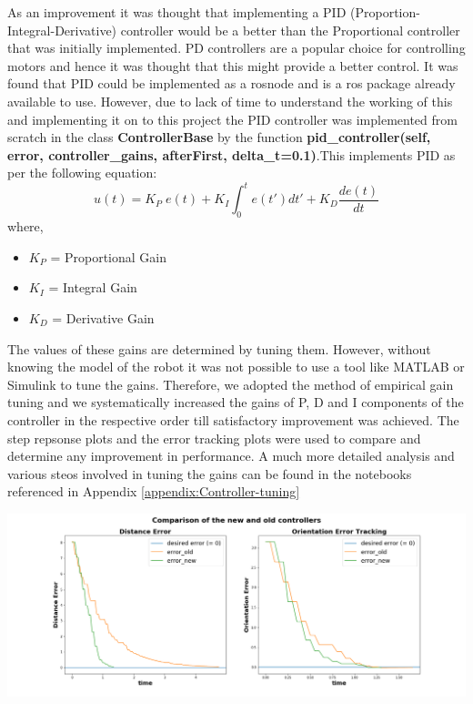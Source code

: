 \documentclass[a4paper,12pt]{article}
\begin{document}
		As an improvement it was thought that implementing a PID (Proportion-Integral-Derivative) controller would be a better than the Proportional controller that was initially implemented. PD controllers are a popular choice for controlling motors and hence it was thought that this might provide a better control. It was found that PID could be implemented as a rosnode and is a ros package already available to use. However, due to lack of time to understand the working of this and implementing it on to this project the PID controller was implemented from scratch in the class \textbf{ControllerBase} by the function \textbf{pid\_controller(self, error, controller\_gains, afterFirst, delta\_t=0.1)}.This implements PID as per the following equation:
		\begin{equation}
			u(t)=K_P \; e(t) + K_I \int_{0}^{t}e(t')dt'+K_D \frac{de(t)}{dt}
		\end{equation}
		where,
		\begin{itemize}
			\item $K_P$ = Proportional Gain
			\item $K_I$ = Integral Gain
			\item $K_D$ = Derivative Gain
		\end{itemize}
	
	The values of these gains are determined by tuning them. However, without knowing the model of the robot it was not possible to use a tool like MATLAB or Simulink to tune the gains. Therefore, we adopted the method of empirical gain tuning and we systematically increased the gains of P, D and I components of the controller in the respective order till satisfactory improvement was achieved. The step repsonse plots and the error tracking plots were used to compare and determine any improvement in performance. A much more detailed analysis and various steos involved in tuning the gains can be found in the notebooks referenced in Appendix \ref{appendix:Controller-tuning}
	
	\includegraphics[scale=0.3]{images/compare_both.png}
	
\end{document}
